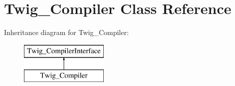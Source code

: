 \hypertarget{classTwig__Compiler}{}\section{Twig\+\_\+\+Compiler Class Reference}
\label{classTwig__Compiler}
Inheritance diagram for Twig\+\_\+\+Compiler\+:\begin{figure}[H]
\begin{center}
\leavevmode
\includegraphics[height=2.000000cm]{classTwig__Compiler}
\end{center}
\end{figure}
